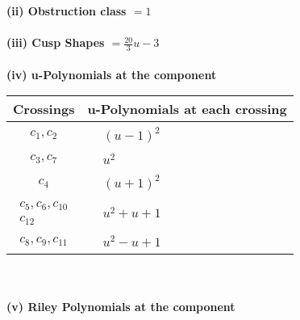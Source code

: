 \documentclass[1p]{elsarticle_modified}
\theoremstyle{definition}
\begin{document}
\flushleft \textbf{(ii) Obstruction class $= 1$}\\~\\
\flushleft \textbf{(iii) Cusp Shapes $= \frac{20}{3} u-3$}\\~\\
\newpage\renewcommand{\arraystretch}{1}
\flushleft \textbf{(iv) u-Polynomials at the component}\newline \\
\begin{tabular}{m{50pt}|m{274pt}}
Crossings & \hspace{64pt}u-Polynomials at each crossing \\
\hline $$\begin{aligned}c_{1},c_{2}\end{aligned}$$&$\begin{aligned}
&(u-1)^2
\end{aligned}$\\
\hline $$\begin{aligned}c_{3},c_{7}\end{aligned}$$&$\begin{aligned}
&u^2
\end{aligned}$\\
\hline $$\begin{aligned}c_{4}\end{aligned}$$&$\begin{aligned}
&(u+1)^2
\end{aligned}$\\
\hline $$\begin{aligned}c_{5},c_{6},c_{10}\\c_{12}\end{aligned}$$&$\begin{aligned}
&u^2+u+1
\end{aligned}$\\
\hline $$\begin{aligned}c_{8},c_{9},c_{11}\end{aligned}$$&$\begin{aligned}
&u^2- u+1
\end{aligned}$\\
\hline
\end{tabular}\\~\\
\newpage\renewcommand{\arraystretch}{1}
\flushleft \textbf{(v) Riley Polynomials at the component}\newline \\
\end{document}
